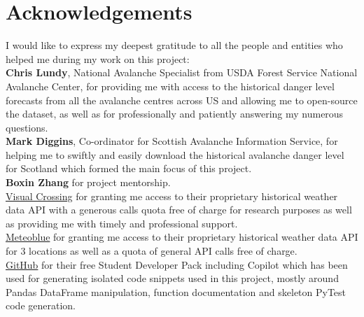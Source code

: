 \documentclass{article}
\begin{document}
	\section*{Acknowledgements}
	I would like to express my deepest gratitude to all the people and entities who helped me during my work on this project:\\
			\newline
			\textbf{Chris Lundy}, National Avalanche Specialist from USDA Forest Service National Avalanche Center, for providing me with access to the historical danger level forecasts from all the avalanche centres across US and allowing me to open-source the dataset, as well as for professionally and patiently answering my numerous questions. \\
			\textbf{Mark Diggins}, Co-ordinator for Scottish Avalanche Information Service, for helping me to swiftly and easily download the historical avalanche danger level for Scotland which formed the main focus of this project.\\
			\textbf{Boxin Zhang} for project mentorship.\\
			\href{https://www.visualcrossing.com/}{Visual Crossing} for granting me access to their proprietary historical weather data API with a generous calls quota free of charge for research purposes as well as providing me with timely and professional support.\\
			\href{https://www.meteoblue.com/}{Meteoblue} for granting me access to their proprietary historical weather data API for 3 locations as well as a quota of general API calls free of charge.\\
			\href{https://github.com/}{GitHub} for their free Student Developer Pack including Copilot which has been used for generating isolated code snippets used in this project, mostly around Pandas DataFrame manipulation, function documentation and skeleton PyTest code generation.

\newpage

\end{document}

